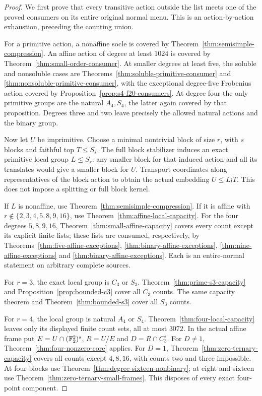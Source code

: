 \begin{proof}
We first prove that every transitive action outside the list meets
one of the proved consumers on its entire original normal menu.
This is an action-by-action exhaustion, preceding the counting union.

For a primitive action, a nonaffine socle is covered by
Theorem~\ref{thm:semisimple-compression}. An affine action of degree
at least $1024$ is covered by Theorem~\ref{thm:small-order-consumer}.
At smaller degrees at least five, the soluble and nonsoluble cases
are Theorems~\ref{thm:soluble-primitive-consumer} and
\ref{thm:nonsoluble-primitive-consumer}, with the exceptional
degree-five Frobenius action covered by
Proposition~\ref{prop:s4-f20-consumers}. At degree four the only
primitive groups are the natural $A_4,S_4$, the latter again
covered by that proposition. Degrees three and two leave precisely
the allowed natural actions and the binary group.

Now let $U$ be imprimitive. Choose a minimal nontrivial block of
size $r$, with $s$ blocks and faithful top $T\leq S_s$.
The full block stabilizer induces an exact primitive local group
$L\leq S_r$: any smaller block for that induced action and all
its translates would give a smaller block for $U$. Transport
coordinates along representatives of the block action to obtain
the actual embedding $U\leq L\wr T$. This does not impose a
splitting or full block kernel.

If $L$ is nonaffine, use Theorem~\ref{thm:semisimple-compression}.
If it is affine with $r\notin\{2,3,4,5,8,9,16\}$, use
Theorem~\ref{thm:affine-local-capacity}. For the four degrees
$5,8,9,16$, Theorem~\ref{thm:small-affine-capacity} covers every
count except its explicit finite lists; these lists are consumed,
respectively, by Theorems~\ref{thm:five-affine-exceptions},
\ref{thm:binary-affine-exceptions}, \ref{thm:nine-affine-exceptions}
and \ref{thm:binary-affine-exceptions}. Each is an entire-normal
statement on arbitrary complete sources.

For $r=3$, the exact local group is $C_3$ or $S_3$.
Theorem~\ref{thm:prime-s3-capacity} and
Proposition~\ref{prop:bounded-c3} cover all $C_3$ counts.
The same capacity theorem and Theorem~\ref{thm:bounded-s3}
cover all $S_3$ counts.

For $r=4$, the local group is natural $A_4$ or $S_4$.
Theorem~\ref{thm:four-local-capacity} leaves only its displayed
finite count sets, all at most $3072$. In the actual affine frame
put $E=U\cap(\mathbb F_2^2)^s$, $R=U/E$ and $D=R\cap C_3^s$.
For $D\ne1$, Theorem~\ref{thm:four-nonzero-core} applies.
For $D=1$, Theorem~\ref{thm:zero-ternary-capacity} covers all
counts except $4,8,16$, with counts two and three impossible.
At four blocks use Theorem~\ref{thm:degree-sixteen-nonbinary};
at eight and sixteen use Theorem~\ref{thm:zero-ternary-small-frames}.
This disposes of every exact four-point component.


\end{proof}
